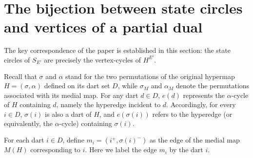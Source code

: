 \documentclass{article}
\begin{document}
\section{The bijection between state circles and vertices of a partial dual}

The key correspondence of the paper is established in this section: the state circles of $S_{E'}$ are precisely the vertex-cycles of $H^{E'}$.

Recall that $\sigma$ and $\alpha$ stand for the two permutations of the original hypermap $H=(\sigma,\alpha)$ defined on its dart set $D$, while $\sigma_M$ and $\alpha_M$ denote the permutations associated with its medial map. For any dart $d\in D$, $e(d)$ represents the $\alpha$-cycle of $H$ containing $d$, namely the hyperedge incident to $d$. Accordingly, for every $i\in D$, $\sigma(i)$ is also a dart of $H$, and $e(\sigma(i))$ refers to the hyperedge (or equivalently, the $\alpha$-cycle) containing $\sigma(i)$.

For each dart $i\in D$, define \(m_i = (i^+, \sigma(i)^-)\) as the edge of the medial map $M(H)$ corresponding to $i$. Here we label the edge $m_i$ by the dart $i$.
\end{document}
